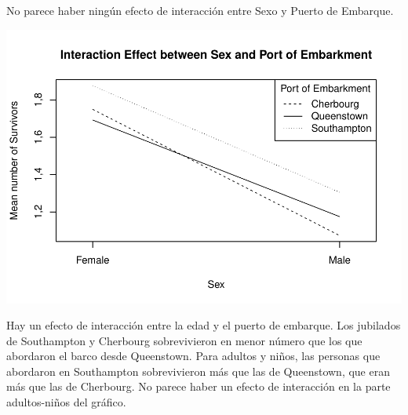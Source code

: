 \documentclass[]{article}
\newenvironment{Shaded}{\begin{snugshade}}{\end{snugshade}}
\newcommand{\KeywordTok}[1]{\textcolor[rgb]{0.13,0.29,0.53}{\textbf{#1}}}
\newcommand{\DataTypeTok}[1]{\textcolor[rgb]{0.13,0.29,0.53}{#1}}
\newcommand{\DecValTok}[1]{\textcolor[rgb]{0.00,0.00,0.81}{#1}}
\newcommand{\StringTok}[1]{\textcolor[rgb]{0.31,0.60,0.02}{#1}}
\newcommand{\OtherTok}[1]{\textcolor[rgb]{0.56,0.35,0.01}{#1}}
\newcommand{\OperatorTok}[1]{\textcolor[rgb]{0.81,0.36,0.00}{\textbf{#1}}}
\newcommand{\NormalTok}[1]{#1}
\begin{document}
No parece haber ningún efecto de interacción entre Sexo y Puerto de
Embarque.

\begin{Shaded}
\end{Shaded}

\includegraphics{titanicDataClean_files/figure-latex/unnamed-chunk-21-1.pdf}

Hay un efecto de interacción entre la edad y el puerto de embarque. Los
jubilados de Southampton y Cherbourg sobrevivieron en menor número que
los que abordaron el barco desde Queenstown. Para adultos y niños, las
personas que abordaron en Southampton sobrevivieron más que las de
Queenstown, que eran más que las de Cherbourg. No parece haber un efecto
de interacción en la parte adultos-niños del gráfico.
\end{document}
